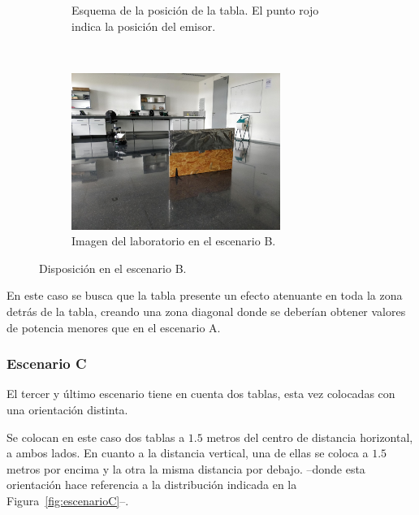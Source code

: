 \begin{figure}[H]
    \centering
    \begin{subfigure}[b]{0.45\textwidth}
        \centering
        
        \caption{Esquema de la posición de la tabla. El punto rojo indica la posición del emisor.}
    \end{subfigure}
    ~~
    \begin{subfigure}[b]{0.45\textwidth}
        \centering
        \includegraphics[width=6.8cm]{pic/escB.jpg}
        \caption{Imagen del laboratorio en el escenario B.}
    \end{subfigure}
    \caption{Disposición en el escenario B.}
    \label{fig:escenarioB}
\end{figure}

En este caso se busca que la tabla presente un efecto atenuante en toda la zona detrás de la tabla, creando una zona diagonal donde se deberían obtener valores de potencia menores que en el escenario A.

\subsubsection{Escenario C}

El tercer y último escenario tiene en cuenta dos tablas, esta vez colocadas con una orientación distinta.

Se colocan en este caso dos tablas a $1.5$ metros del centro de distancia horizontal, a ambos lados.
En cuanto a la distancia vertical, una de ellas se coloca a $1.5$ metros por encima y la otra la misma distancia por debajo. --donde esta orientación hace referencia a la distribución indicada en la Figura~\ref{fig:escenarioC}--.

